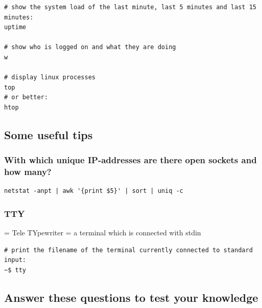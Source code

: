\documentclass{article}
\begin{document}
\begin{verbatim}
# show the system load of the last minute, last 5 minutes and last 15 minutes:
uptime

# show who is logged on and what they are doing
w

# display linux processes
top
# or better:
htop
\end{verbatim}

\subsection{Some useful tips}

\subsubsection{With which unique IP-addresses are there open sockets and how many?}

\begin{verbatim}
netstat -anpt | awk '{print $5}' | sort | uniq -c
\end{verbatim}

\subsubsection{TTY}

= Tele TYpewriter
= a terminal which is connected with stdin

\begin{verbatim}
# print the filename of the terminal currently connected to standard input:
~$ tty
\end{verbatim}

\subsection{Answer these questions to test your knowledge}
\end{document}
